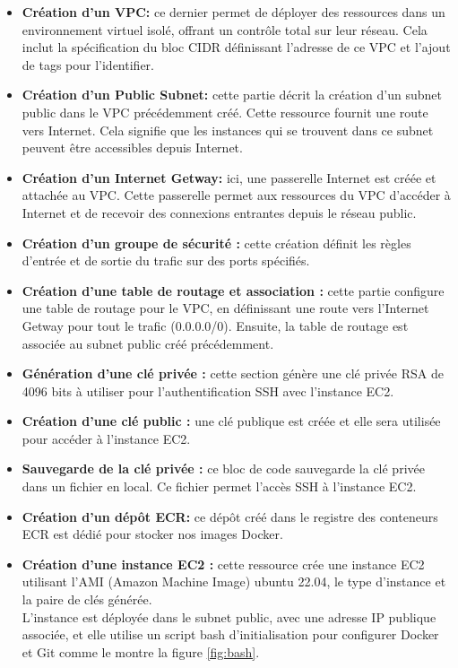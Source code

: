 \begin{itemize}
    \item \textbf{Création d'un VPC:} ce dernier permet de déployer des ressources dans un environnement virtuel isolé, offrant un contrôle total sur leur réseau. Cela inclut la spécification du bloc CIDR définissant l'adresse de ce VPC et l'ajout de tags pour l'identifier.
    \item \textbf{Création d'un Public Subnet:} cette partie décrit la création d'un subnet public dans le VPC précédemment créé. Cette ressource fournit une route vers Internet. Cela signifie que les instances qui se trouvent dans ce subnet peuvent être accessibles depuis Internet.
    \item \textbf{Création d'un Internet Getway:} ici, une passerelle Internet est créée et attachée au VPC. Cette passerelle permet aux ressources du VPC d'accéder à Internet et de recevoir des connexions entrantes depuis le réseau public.
    \item \textbf{Création d'un groupe de sécurité :} cette création définit les règles d'entrée et de sortie du trafic sur des ports spécifiés.
    \item \textbf{Création d'une table de routage et association :} cette partie configure une table de routage pour le VPC, en définissant une route vers l'Internet Getway pour tout le trafic (0.0.0.0/0). Ensuite, la table de routage est associée au subnet public créé précédemment.
    \item \textbf{Génération d'une clé privée :} cette section génère une clé privée RSA de 4096 bits à utiliser pour l'authentification SSH avec l'instance EC2.
    \item \textbf{Création d'une clé public :} une clé publique est créée et elle sera utilisée pour accéder à l'instance EC2.
    \item \textbf{Sauvegarde de la clé privée :} ce bloc de code sauvegarde la clé privée dans un fichier en local. Ce fichier permet l'accès SSH à l'instance EC2.
    \item \textbf{Création d'un dépôt ECR:} ce dépôt créé dans le registre des conteneurs ECR est dédié pour stocker nos images Docker.
    \item \textbf{Création d'une instance EC2 :} cette ressource crée une instance EC2 utilisant l'AMI (Amazon Machine Image) ubuntu 22.04, le type d'instance et la paire de clés générée.\\ L'instance est déployée dans le subnet public, avec une adresse IP publique associée, et elle utilise un script bash d'initialisation pour configurer Docker et Git comme le montre la figure \ref{fig:bash}.

\end{itemize}
